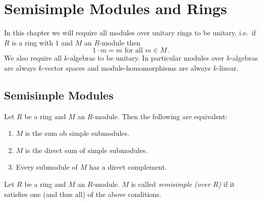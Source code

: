 \chapter{Semisimple Modules and Rings}


In this chapter we will require all modules over unitary rings to be unitary, i.e.\ if $R$ is a ring with $1$ and $M$ an $R$-module then
\[
    1 \cdot m
  = m
  \text{ for all }
  m \in M \,.
\]
We also require all $k$-algebras to be unitary.
In particular modules over $k$-algebras are always $k$-vector spaces and module-homomorphisms are always $k$-linear.





\section{Semisimple Modules}


\begin{proposition}\label{proposition: characterisation semisimple modules}
  Let $R$ be a ring and $M$ an $R$-module. Then the following are equivalent:
  \begin{enumerate}[label=\emph{\roman*)},leftmargin=*]
    \item \label{enum: sum of simple}
      $M$ is the sum ob simple submodules.
    \item \label{enum: direct sum of simple}
      $M$ is the direct sum of simple submodules. 
    \item \label{enum: direct complements}
      Every submodule of $M$ has a direct complement.
  \end{enumerate}
\end{proposition}


\begin{definition}
  Let $R$ be a ring and $M$ an $R$-module.
  $M$ is called \emph{semisimple (over $R$)} if it satisfies one (and thus all) of the above conditions.
\end{definition}


